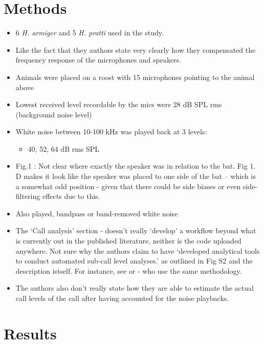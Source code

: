\documentclass[
]{book}
\providecommand{\tightlist}{%
  \setlength{\itemsep}{0pt}\setlength{\parskip}{0pt}}
\begin{document}
\hypertarget{methods-11}{%
\section{Methods}\label{methods-11}}

\begin{itemize}
\tightlist
\item
  6 \emph{H. armiger} and 5 \emph{H. pratti} used in the study.
\item
  Like the fact that they authors state very clearly how they compensated the frequency response of the microphones and speakers.
\item
  Animals were placed on a roost with 15 microphones pointing to the animal above
\item
  Lowest received level recordable by the mics were 28 dB SPL rms (background noise level)
\item
  White noise between 10-100 kHz was played back at 3 levels:

  \begin{itemize}
  \tightlist
  \item
    40, 52, 64 dB rms SPL
  \end{itemize}
\item
  Fig.1 : Not clear where exactly the speaker was in relation to the bat. Fig 1. D makes it look like the speaker was placed to one side of the bat -- which is a somewhat odd position - given that there could be side biases or even side-filtering effects due to this.
\item
  Also played, bandpass or band-removed white noise
\item
  The `Call analysis' section - doesn't really `develop' a workflow beyond what is currently out in the published literature, neither is the code uploaded anywhere. Not sure why the authors claim to have `developed analytical tools to conduct automated sub-call level analyses.' as outlined in Fig S2 and the description istself. For instance, see \citep{siemers2005species} or \citep{schoeppler2018precise} - who use the same methodology.
\item
  The authors also don't really state how they are able to estimate the actual call levels of the call after having accounted for the noise playbacks.
\end{itemize}

\hypertarget{results-11}{%
\section{Results}\label{results-11}}
\end{document}

